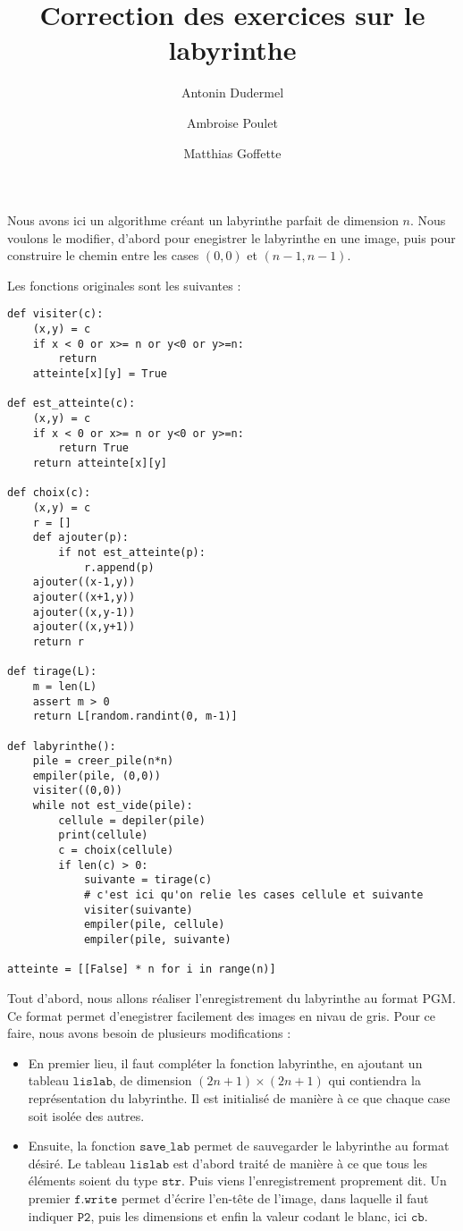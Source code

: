 \documentclass[11pt,a4paper]{article}
\title{Correction des exercices sur le labyrinthe}
\date{}
\author{Antonin Dudermel \and Ambroise Poulet \and Matthias Goffette}
\begin{document}

\maketitle

\begin{it}
Nous avons ici un algorithme créant un labyrinthe parfait de dimension $n$. Nous voulons le modifier, d'abord pour enegistrer le labyrinthe en une image, puis pour construire le chemin entre les cases $(0,0)$ et $(n-1,n-1)$.
\end{it}
\par
Les fonctions originales sont les suivantes :

\begin{lstlisting}
def visiter(c):
    (x,y) = c
    if x < 0 or x>= n or y<0 or y>=n:
        return
    atteinte[x][y] = True

def est_atteinte(c):
    (x,y) = c
    if x < 0 or x>= n or y<0 or y>=n:
        return True
    return atteinte[x][y]

def choix(c):
    (x,y) = c
    r = []
    def ajouter(p):
        if not est_atteinte(p):
            r.append(p)
    ajouter((x-1,y))
    ajouter((x+1,y))
    ajouter((x,y-1))
    ajouter((x,y+1))
    return r

def tirage(L):
    m = len(L)
    assert m > 0
    return L[random.randint(0, m-1)]

def labyrinthe():
    pile = creer_pile(n*n)
    empiler(pile, (0,0))
    visiter((0,0))
    while not est_vide(pile):
        cellule = depiler(pile)
        print(cellule)
        c = choix(cellule)
        if len(c) > 0:
            suivante = tirage(c)
            # c'est ici qu'on relie les cases cellule et suivante
            visiter(suivante)
            empiler(pile, cellule)
            empiler(pile, suivante)
            
atteinte = [[False] * n for i in range(n)]
\end{lstlisting}
\par
Tout d'abord, nous allons réaliser l'enregistrement du labyrinthe au format PGM. Ce format permet d'enegistrer facilement des images en nivau de gris. Pour ce faire, nous avons besoin de plusieurs modifications :
\begin{itemize}
	\item En premier lieu, il faut compléter la fonction labyrinthe, en ajoutant un tableau $\mathtt{lislab}$, de dimension $(2n+1) \times (2n+1)$ qui contiendra la représentation du labyrinthe. Il est initialisé de manière à ce que chaque case soit isolée des autres.
	\item Ensuite, la fonction $\mathtt{save\_lab}$ permet de sauvegarder le labyrinthe au format désiré. Le tableau $\mathtt{lislab}$ est d'abord traité de manière à ce que tous les éléments soient du type $\mathtt{str}$. Puis viens l'enregistrement proprement dit. Un premier $\mathtt{f.write}$ permet d'écrire l'en-tête de l'image, dans laquelle il faut indiquer $\mathtt{P2}$, puis les dimensions et enfin la valeur codant le blanc, ici $\mathtt{cb}$.
\end{itemize}
\end{document}
